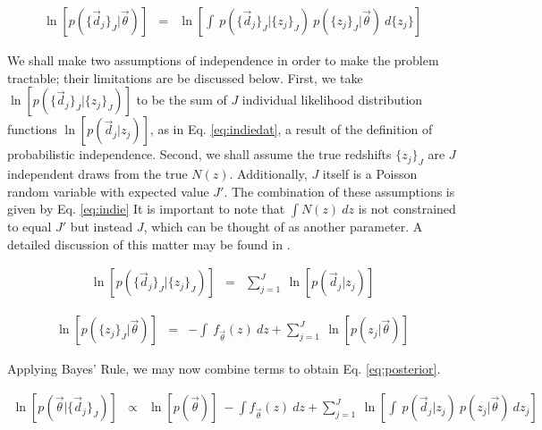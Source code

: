 \documentclass[preprint]{aastex}
\begin{document}
\begin{eqnarray}
\label{eq:marginalize}
\ln[p(\{\vec{d}_{j}\}_{J}|\vec{\theta})] &=& \ln\left[\int\ 
p(\{\vec{d}_{j}\}_{J}|\{z_{j}\}_{J})\ p(\{z_{j}\}_{J}|\vec{\theta})\ 
d\{z_{j}\}\right]
\end{eqnarray}

We shall make two assumptions of independence in order to make the problem 
tractable; their limitations are be discussed below.  First, we take 
$\ln[p(\{\vec{d}_{j}\}_{J}|\{z_{j}\}_{J})]$ to be the sum of $J$ individual 
likelihood distribution functions $\ln[p(\vec{d}_{j}|z_{j})]$, as in Eq. 
\ref{eq:indiedat}, a result of the definition of probabilistic independence.  
Second, we shall assume the true redshifts $\{z_{j}\}_{J}$ are $J$ independent 
draws from the true $N(z)$.  Additionally, $J$ itself is a Poisson random 
variable with expected value $J'$.  The combination of these assumptions is 
given by Eq. \ref{eq:indie}  It is important to note that $\int N(z)\ dz$ is 
not constrained to equal $J'$ but instead $J$, which can be thought of as 
another parameter.  A detailed discussion of this matter may be found in 
\citet{Foreman-Mackey2014}.

\begin{eqnarray}
\label{eq:indiedat}
\ln[p(\{\vec{d}_{j}\}_{J}|\{z_{j}\}_{J})] &=& \sum_{j=1}^{J}\ 
\ln[p(\vec{d}_{j}|z_{j})]
\end{eqnarray}

\begin{eqnarray}
\label{eq:indie}
\ln[p(\{z_{j}\}_{J}|\vec{\theta})] &=& -\int\ f_{\vec{\theta}}(z)\ dz +  
\sum_{j=1}^{J}\ \ln[p(z_{j}|\vec{\theta})]
\end{eqnarray}

Applying Bayes' Rule, we may now combine terms to obtain Eq. 
\ref{eq:posterior}.  

\begin{eqnarray}
\label{eq:posterior}
\ln[p(\vec{\theta}|\{\vec{d}_{j}\}_{J})] &\propto& \ln[p(\vec{\theta})]\ -\int 
f_{\vec{\theta}}(z)\ dz + \sum_{j=1}^{J}\ \ln\left[\int\ p(\vec{d}_{j}|z_{j})\ 
p(z_{j}|\vec{\theta})\ dz_{j}\right]
\end{eqnarray}
\end{document}
